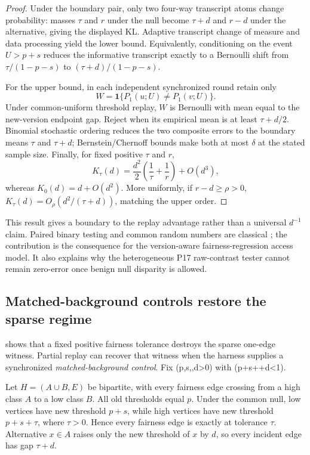 \begin{proof}
Under the boundary pair, only two four-way transcript atoms change probability:
masses $\tau$ and $r$ under the null become $\tau+d$ and $r-d$ under the
alternative, giving the displayed KL.  Adaptive transcript change of measure
and data processing yield the lower bound.  Equivalently, conditioning on the
event $U>p+s$ reduces the informative transcript exactly to a Bernoulli shift
from $\tau/(1-p-s)$ to $(\tau+d)/(1-p-s)$.

For the upper bound, in each independent synchronized round retain only
\[
W=\mathbf 1\{P_1(u;U)\ne P_1(v;U)\}.
\]
Under common-uniform threshold replay, $W$ is Bernoulli with mean equal to the
new-version endpoint gap.  Reject when its empirical mean is at least
$\tau+d/2$.  Binomial stochastic ordering reduces the two composite errors to
the boundary means $\tau$ and $\tau+d$; Bernstein/Chernoff bounds make both at
most $\delta$ at the stated sample size.  Finally, for fixed positive $\tau$
and $r$,
\[
K_\tau(d)
=
\frac{d^2}{2}\left(\frac1\tau+\frac1r\right)+O(d^3),
\]
whereas $K_0(d)=d+O(d^2)$.  More uniformly, if $r-d\ge\rho>0$,
$K_\tau(d)=O_\rho(d^2/(\tau+d))$, matching the upper order.
\end{proof}



This result gives a boundary to the replay advantage rather than a universal
$d^{-1}$ claim.  Paired binary testing and common random numbers are classical
\cite{Connor1987,GlassermanYao1992}; the contribution is the consequence for
the version-aware fairness-regression access model.  It also explains why the
heterogeneous P17 raw-contrast tester cannot remain zero-error once benign null
disparity is allowed.


\subsection{Matched-background controls restore the sparse regime}
\label{sec:control-replay}

 shows that a fixed positive fairness
tolerance destroys the sparse one-edge witness.  Partial replay can recover that
witness when the harness supplies a synchronized \emph{matched-background
control}.  Fix (p,s,\tau,d>0) with (p+s+\tau+d<1).

Let \(H=(A\cup B,E)\) be bipartite, with every fairness edge crossing from a
high class \(A\) to a low class \(B\).  All old thresholds equal \(p\).  Under
the common null, low vertices have new threshold \(p+s\), while high vertices
have new threshold \(p+s+\tau\), where \(\tau>0\).  Hence every fairness edge is
exactly at tolerance \(\tau\).  Alternative \(x\in A\) raises only the new
threshold of \(x\) by \(d\), so every incident edge has gap \(\tau+d\).

